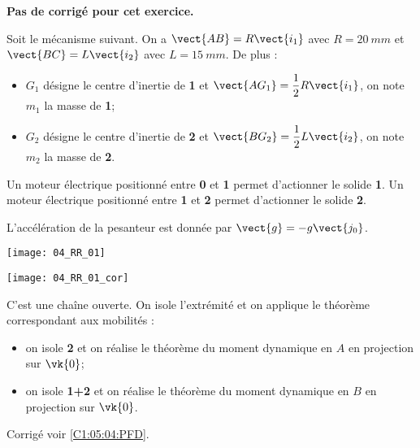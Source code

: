 \normaltrue
\correctiontrue


\setcounter{numques}{0}
\ifcorrection
\else
\textbf{Pas de corrigé pour cet exercice.}
\fi

\ifprof
\else
Soit le mécanisme suivant. On a $\vect{AB}=R\vect{i_1}$ avec $R=\SI{20}{mm}$ et  
$\vect{BC}=L\vect{i_2}$ avec $L=\SI{15}{mm}$. De plus :
\begin{itemize}
\item $G_1$ désigne le centre d'inertie de \textbf{1} et $\vect{AG_1}=\dfrac{1}{2}R\vect{i_1}$, on note $m_1$ la masse de \textbf{1}; %
\item $G_2$ désigne le centre d'inertie de \textbf{2} et $\vect{BG_2}=\dfrac{1}{2}L\vect{i_2}$, on note $m_2$ la masse de \textbf{2}.%
\end{itemize}

Un moteur électrique positionné entre \textbf{0} et \textbf{1} permet d'actionner le solide \textbf{1}.
Un moteur électrique positionné entre \textbf{1} et \textbf{2} permet d'actionner le solide \textbf{2}.

L'accélération de la pesanteur est donnée par $\vect{g}=-g\vect{j_0}$.

\begin{center}
\texttt{[image: 04\_RR\_01]}
\end{center}
\fi

\ifprof

\begin{center}
\texttt{[image: 04\_RR\_01\_cor]}
\end{center}
\else
\fi

\ifprof
C'est une chaîne ouverte. On isole l'extrémité et on applique le théorème correspondant aux mobilités : 
\begin{itemize}
\item on isole \textbf{2} et on réalise le théorème du moment dynamique en $A$ en projection sur $\vk{0}$;
\item on isole \textbf{1+2} et on réalise le théorème du moment dynamique en $B$ en projection sur $\vk{0}$.
\end{itemize}
\else
\fi


\ifprof
\else
\begin{flushright}
\footnotesize{Corrigé  voir \ref{C1:05:04:PFD}.}
\end{flushright}%
\fi
